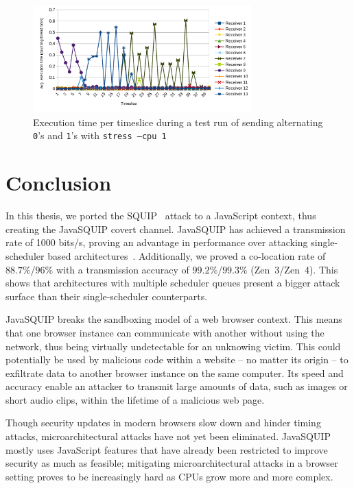 \documentclass[11pt,
  titlepage=false,
]{scrreprt}
\begin{document}
\begin{figure}
    \centering
    \includegraphics[width=0.75\textwidth]{figures/contentiontest_stress}

    \caption{Execution time per timeslice during a test run of sending alternating \texttt{0}'s and \texttt{1}'s with \texttt{stress --cpu 1}}
    \label{fig:contentiontest_stress}
\end{figure}


\chapter{Conclusion}
\label{ch:conclusion}
In this thesis, we ported the SQUIP~\cite{squip} attack to a JavaScript context, thus creating the JavaSQUIP covert channel.
JavaSQUIP has achieved a transmission rate of 1000 bits/s, proving an advantage in performance over attacking single-scheduler based architectures~\cite{Rokicki2022webport}.
Additionally, we proved a co-location rate of $88.7\%$/$96\%$ with a transmission accuracy of $99.2\%$/$99.3\%$ (Zen~3/Zen~4).
This shows that architectures with multiple scheduler queues present a bigger attack surface than their single-scheduler counterparts.

JavaSQUIP breaks the sandboxing model of a web browser context.
This means that one browser instance can communicate with another without using the network, thus being virtually undetectable for an unknowing victim.
This could potentially be used by malicious code within a website -- no matter its origin -- to exfiltrate data to another browser instance on the same computer.
Its speed and accuracy enable an attacker to transmit large amounts of data, such as images or short audio clips, within the lifetime of a malicious web page.

Though security updates in modern browsers slow down and hinder timing attacks, microarchitectural attacks have not yet been eliminated.
JavaSQUIP mostly uses JavaScript features that have already been restricted to improve security as much as feasible;
mitigating microarchitectural attacks in a browser setting proves to be increasingly hard as CPUs grow more and more complex.


\pagebreak
\printbibliography
\end{document}
